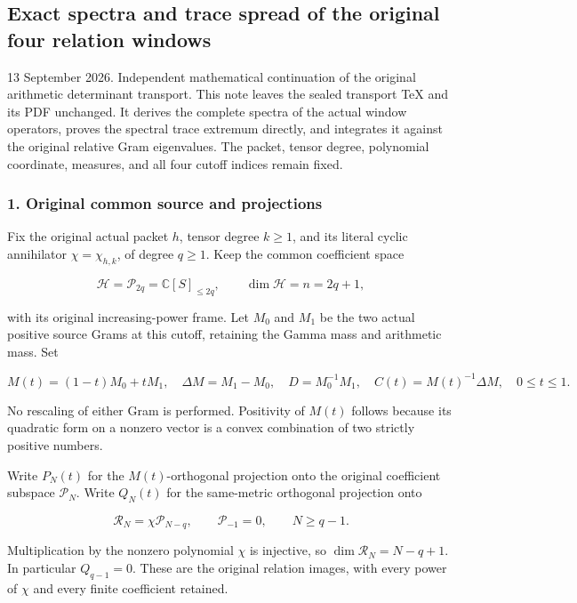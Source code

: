 \subsection{Exact spectra and trace spread of the original four relation windows}\label{endpoint-window_review--exact-spectra-and-trace-spread-of-the-original-four-relation-windows}

13 September 2026. Independent mathematical continuation of the original arithmetic determinant transport. This note leaves the sealed transport TeX and its PDF unchanged. It derives the complete spectra of the actual window operators, proves the spectral trace extremum directly, and integrates it against the original relative Gram eigenvalues. The packet, tensor degree, polynomial coordinate, measures, and all four cutoff indices remain fixed.

\subsubsection{1. Original common source and projections}\label{endpoint-window_review--original-common-source-and-projections}

Fix the original actual packet \(h\), tensor degree \(k\ge1\), and its literal cyclic annihilator \(\chi=\chi_{h,k}\), of degree \(q\ge1\). Keep the common coefficient space

\[
\mathcal H=\mathcal P_{2q}=\mathbb C[S]_{\le2q},
\qquad \dim\mathcal H=n=2q+1,
\tag{WS1}
\]

with its original increasing-power frame. Let \(M_0\) and \(M_1\) be the two actual positive source Grams at this cutoff, retaining the Gamma mass and arithmetic mass. Set

\[
M(t)=(1-t)M_0+tM_1,
\quad \Delta M=M_1-M_0,
\quad D=M_0^{-1}M_1,
\quad C(t)=M(t)^{-1}\Delta M,
\quad 0\le t\le1.
\tag{WS2}
\]

No rescaling of either Gram is performed. Positivity of \(M(t)\) follows because its quadratic form on a nonzero vector is a convex combination of two strictly positive numbers.

Write \(P_N(t)\) for the \(M(t)\)-orthogonal projection onto the original coefficient subspace \(\mathcal P_N\). Write \(Q_N(t)\) for the same-metric orthogonal projection onto

\[
\mathcal R_N=\chi\mathcal P_{N-q},
\qquad \mathcal P_{-1}=0,
\qquad N\ge q-1.
\tag{WS3}
\]

Multiplication by the nonzero polynomial \(\chi\) is injective, so \(\dim\mathcal R_N=N-q+1\). In particular \(Q_{q-1}=0\). These are the original relation images, with every power of \(\chi\) and every finite coefficient retained.

